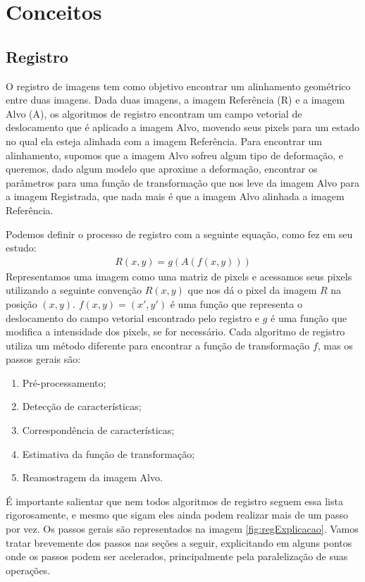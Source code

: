 \chapter{Conceitos}
\label{cap:conceitos}

\section{Registro}
\label{sec:fundamentos}

    O registro de imagens tem como objetivo encontrar um alinhamento geométrico entre duas imagens. Dada duas imagens, 
a imagem Referência (R) e a imagem Alvo (A), os algoritmos de registro encontram um campo
vetorial de deslocamento que é aplicado a imagem Alvo, movendo seus pixels para um estado no qual ela esteja alinhada
com a imagem Referência. Para encontrar um alinhamento, supomos que a imagem Alvo sofreu algum tipo de deformação,
e queremos, dado algum modelo que aproxime a deformação, encontrar os parâmetros para uma função de
transformação que nos leve da imagem Alvo para a imagem Registrada, que nada mais é que a imagem Alvo alinhada a imagem
Referência.

Podemos definir o processo de registro com a seguinte equação, como \cite{brown1992survey} fez em seu estudo:
\begin{align}\label{eq:defregistro}
    R(x,y) = g(A(f(x,y)))
\end{align}
    Representamos uma imagem como uma matriz de pixels e acessamos seus pixels utilizando a seguinte convenção $R(x,y)$ 
que nos dá o pixel da imagem $R$ na posição $(x,y)$. $f(x,y) = (x',y')$ é uma função que representa o deslocamento do 
campo vetorial encontrado pelo registro e $g$ é uma função que modifica a intensidade dos pixels, se for necessário.
Cada algoritmo de registro utiliza um método diferente para encontrar a função de transformação $f$, mas os passos gerais são:
\begin{enumerate}
    \item Pré-processamento;
    \item Detecção de características;
    \item Correspondência de características;
    \item Estimativa da função de transformação;
    \item Reamostragem da imagem Alvo.
\end{enumerate} %
    É importante salientar que nem todos algoritmos de registro seguem essa lista rigorosamente, e mesmo que sigam eles ainda
podem realizar mais de um passo por vez. Os passos gerais são representados na imagem \ref{fig:regExplicacao}. 
Vamos tratar brevemente dos passos nas seções a seguir, explicitando em alguns pontos onde os passos podem ser acelerados,
principalmente pela paralelização de suas operações.


